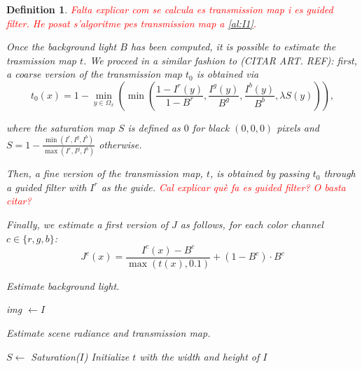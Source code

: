 \documentclass[twocolumn,twoside,a4paper,10pt]{IEEEtran}
\newtheorem{definition}{Definition}
\newcommand{\Frank}[1]{\textcolor{red}{#1}}
\begin{document}
\begin{definition}
\Frank{Falta explicar com se calcula es transmission map i es guided filter. He posat s'algoritme pes transmission map a \ref{al:I1}.}

Once the background light \(B\) has been computed, it is possible to estimate the trasmission map \(t\). We proceed in a similar fashion to (CITAR ART. REF): first, a coarse version of the transmission map \(t_0\) is obtained via
\[
  t_0(x) = 1 - \min_{y\in\Omega_x}\left(\min\left(\frac{1-I^r(y)}{1-B^r}, \frac{I^g(y)}{B^g}, \frac{I^b(y)}{B^b}, \lambda S(y)\right)\right)
,\]

where the \textit{saturation map} \(S\) is defined as \(0\) for black \((0, 0, 0)\) pixels and \(S=1-\frac{\min(I^r, I^g, I^b)}{\max(I^r, I^g, I^b)}\) otherwise.

Then, a fine version of the transmission map, \(t\), is obtained by passing \(t_0\) through a guided filter with \(I^r\) as the guide. \Frank{Cal explicar què fa es guided filter? O basta citar?}

Finally, we estimate a first version of \(J\) as follows, for each color channel \(c\in\{r, g, b\}\):
\begin{equation}\label{eq:J0}
  J^c(x) = \frac{I^c(x) - B^c}{\max(t(x), 0.1)} + (1-B^c)\cdot B^c
\end{equation}

\begin{algorithm}\label{al:background-light}
\caption{Estimate background light.}

img \(\gets I\)\;
\end{algorithm}

\begin{algorithm}\label{al:I1}
\caption{Estimate scene radiance and transmission map.}

\(S\gets \) Saturation(\(I\))\;
Initialize \(t\) with the width and height of \(I\)\;
\end{algorithm}
\end{definition}
\end{document}
